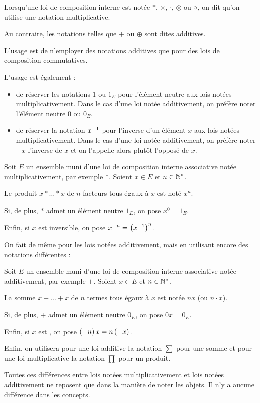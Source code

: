 \begin{nota}
Lorsqu'une loi de composition interne est notée \(*\), \(\times\), \(\cdot\), \(\otimes\) ou \(\circ\), on dit qu'on utilise une notation multiplicative.

Au contraire, les notations telles que \(+\) ou \(\oplus\) sont dites additives.

L'usage est de n'employer des notations additives que pour des lois de composition commutatives.

L'usage est également :

\begin{itemize}
\item de réserver les notations \(1\) ou \(1_E\) pour l'élément neutre aux lois notées multiplicativement. Dans le cas d'une loi notée additivement, on préfère noter l'élément neutre \(0\) ou \(0_E\). \\

\item de réserver la notation \(x^{-1}\) pour l'inverse d'un élément \(x\) aux lois notées multiplicativement. Dans le cas d'une loi notée additivement, on préfère noter \(-x\) l'inverse de \(x\) et on l'appelle alors plutôt l'opposé de \(x\).
\end{itemize}

Soit \(E\) un ensemble muni d'une loi de composition interne associative notée multiplicativement, par exemple \(*\). Soient \(x\in E\) et \(n\in\mathbb{N}^*\).

Le produit \(x*\dots*x\) de \(n\) facteurs tous égaux à \(x\) est noté \(x^n\).

Si, de plus, \(*\) admet un élément neutre \(1_E\), on pose \(x^0=1_E\).

Enfin, si \(x\) est inversible, on pose \(x^{-n}=\left(x^{-1}\right)^n\).

On fait de même pour les lois notées additivement, mais en utilisant encore des notations différentes :

Soit \(E\) un ensemble muni d'une loi de composition interne associative notée additivement, par exemple \(+\). Soient \(x\in E\) et \(n\in\mathbb{N}^*\).

La somme \(x+\dots+x\) de \(n\) termes tous égaux à \(x\) est notée \(nx\) (ou \(n\cdot x\)).

Si, de plus, \(+\) admet un élément neutre \(0_E\), on pose \(0x=0_E\).

Enfin, si \(x\) est , on pose \(\left(-n\right)x=n\left(-x\right)\).

Enfin, on utilisera pour une loi additive la notation \(\sum\) pour une somme et pour une loi multiplicative la notation \(\prod\) pour un produit.

Toutes ces différences entre lois notées multiplicativement et lois notées additivement ne reposent que dans la manière de noter les objets. Il n'y a aucune différence dans les concepts.
\end{nota}

